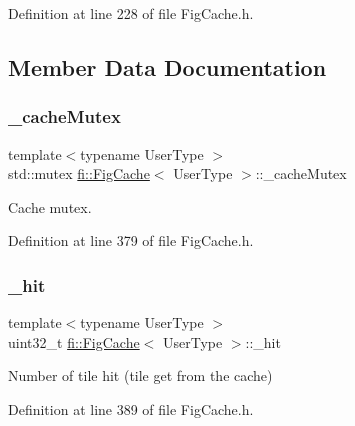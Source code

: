 Definition at line 228 of file Fig\+Cache.\+h.



\subsection{Member Data Documentation}
\mbox{\label{classfi_1_1FigCache_a9ddaac59b751d561d4d578dbeb0751df}} 
\subsubsection{\texorpdfstring{\+\_\+cache\+Mutex}{\_cacheMutex}}
{\footnotesize\ttfamily template$<$typename User\+Type $>$ \\
std\+::mutex \hyperlink{classfi_1_1FigCache}{fi\+::\+Fig\+Cache}$<$ User\+Type $>$\+::\+\_\+cache\+Mutex\hspace{0.3cm}{\ttfamily [private]}}



Cache mutex. 



Definition at line 379 of file Fig\+Cache.\+h.

\mbox{\label{classfi_1_1FigCache_abf3763839280072304e2c9d83467307b}} 
\subsubsection{\texorpdfstring{\+\_\+hit}{\_hit}}
{\footnotesize\ttfamily template$<$typename User\+Type $>$ \\
uint32\+\_\+t \hyperlink{classfi_1_1FigCache}{fi\+::\+Fig\+Cache}$<$ User\+Type $>$\+::\+\_\+hit\hspace{0.3cm}{\ttfamily [private]}}



Number of tile hit (tile get from the cache) 



Definition at line 389 of file Fig\+Cache.\+h.

\mbox{\label{classfi_1_1FigCache_aebef3d39629bfca7fb0d3945b441bd36}} 
